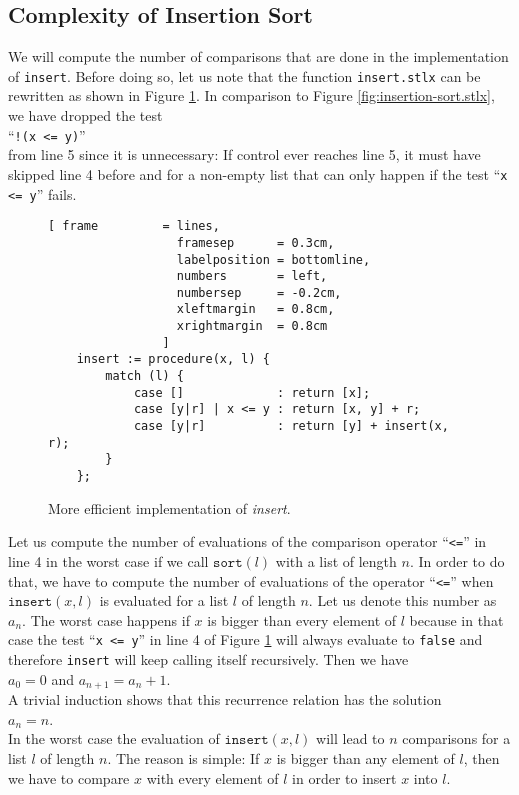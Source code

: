 \subsection{Complexity of Insertion Sort}
We will compute the number of comparisons that are done in the implementation of \texttt{insert}.
Before doing so, let us note that the function \texttt{insert.stlx} can be rewritten as shown in Figure
\ref{fig:insert.stlx}.  In comparison to Figure \ref{fig:insertion-sort.stlx}, we have dropped the
test
\\[0.2cm]
\hspace*{1.3cm}
``\texttt{!(x <= y)}'' 
\\[0.2cm]
from line 5 since it is unnecessary:  If control ever reaches line 5, it must
have skipped line 4 before and for a non-empty list that can only happen if the test 
``\texttt{x <= y}'' fails.
\begin{figure}[!ht]
  \centering
\begin{Verbatim}[ frame         = lines, 
                  framesep      = 0.3cm, 
                  labelposition = bottomline,
                  numbers       = left,
                  numbersep     = -0.2cm,
                  xleftmargin   = 0.8cm,
                  xrightmargin  = 0.8cm
                ]
    insert := procedure(x, l) {
        match (l) {
            case []             : return [x];
            case [y|r] | x <= y : return [x, y] + r;
            case [y|r]          : return [y] + insert(x, r);
        }
    };
\end{Verbatim}
\vspace*{-0.3cm}
  \caption{More efficient implementation of \emph{insert}.}
  \label{fig:insert.stlx}
\end{figure} 

Let us compute the number of evaluations of the comparison operator ``\texttt{<=}'' in line 4 in the
worst case if we call $\texttt{sort}(l)$ with a list of length $n$. In order to do that, we have to
compute the number of evaluations of the operator ``\texttt{<=}'' when 
 $\texttt{insert}(x,l)$ is evaluated for a list $l$ of length $n$.  Let us denote this number as 
$a_n$.  The worst case happens if $x$ is bigger than every element of $l$ because in that case the
test ``\texttt{x <= y}'' in line 4 of Figure \ref{fig:insert.stlx} will always evaluate to
\texttt{false} and therefore \texttt{insert} will keep calling itself recursively.
Then we have
\\[0.2cm]
\hspace*{1.3cm}
$a_0 = 0$ \quad and \quad $a_{n+1} = a_n + 1$. 
\\[0.2cm]
A trivial induction shows that this recurrence relation has the solution
\\[0.2cm]
\hspace*{1.3cm} 
$a_n = n$.
\\[0.2cm]
In the worst case the evaluation of $\mathtt{insert}(x,l)$ will lead to $n$ comparisons for a list
$l$ of length $n$.  The reason is simple:  If $x$ is bigger than any element of $l$, then we have to
compare $x$ with every element of $l$ in order to insert $x$ into $l$.

